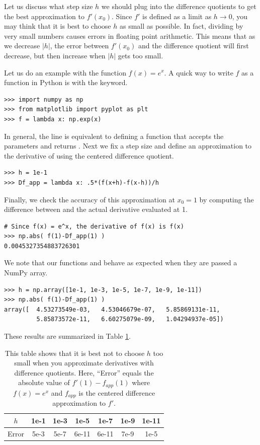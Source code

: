 Let us discuss what step size $h$ we should plug into the difference quotients to get the best approximation to $f'(x_0)$.
Since $f'$ is defined as a limit as $h \rightarrow 0$, you may think that it is best to choose $h$ as small as possible.
In fact, dividing by very small numbers causes errors in floating point arithmetic.
This means that as we decrease $|h|$, the error between $f'(x_0)$ and the difference quotient will first decrease, but then increase when $|h|$ gets too small. 

Let us do an example with the function $f(x) = e^x$. A quick way to write $f$ as a function in Python is with the  keyword.
\begin{lstlisting}
>>> import numpy as np
>>> from matplotlib import pyplot as plt
>>> f = lambda x: np.exp(x)
\end{lstlisting}
In general, the line  is equivalent to defining a function  that accepts the parameters  and returns .
Next we fix a step size  and define an approximation to the derivative of  using the centered difference quotient.
\begin{lstlisting}
>>> h = 1e-1
>>> Df_app = lambda x: .5*(f(x+h)-f(x-h))/h
\end{lstlisting}
Finally, we check the accuracy of this approximation at $x_0=1$ by computing the difference between  and the actual derivative evaluated at 1.
\begin{lstlisting}
# Since f(x) = e^x, the derivative of f(x) is f(x)
>>> np.abs( f(1)-Df_app(1) )
0.0045327354883726301
\end{lstlisting}
We note that our functions  and  behave as expected when they are passed a NumPy array.
\begin{lstlisting}
>>> h = np.array([1e-1, 1e-3, 1e-5, 1e-7, 1e-9, 1e-11])
>>> np.abs( f(1)-Df_app(1) )
array([  4.53273549e-03,   4.53046679e-07,   5.85869131e-11,
         5.85873572e-11,   6.60275079e-09,   1.04294937e-05])
\end{lstlisting}
These results are summarized in Table \ref{table:approx_errors}.

\begin{table}
\begin{center}
\begin{tabular}{|c|c|c|c|c|c|c|}
\hline
$h$ 		& 1e-1 & 1e-3 & 1e-5 & 1e-7	 & 1e-9 & 1e-11 \\ \hline
Error  	& 5e-3 & 5e-7 & 6e-11 & 6e-11 & 7e-9 & 1e-5\\ \hline
\end{tabular}
\caption{This table shows that it is best not to choose $h$ too small when you approximate derivatives with difference quotients. 
Here, ``Error'' equals the absolute value of $f'(1)-f_{app}(1)$ where $f(x) = e^x$ and $f_{app}$ is the centered difference approximation to $f'$.}
\label{table:approx_errors}
\end{center}
\end{table}


